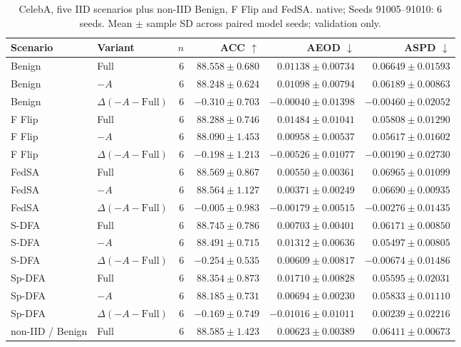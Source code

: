 \begin{table}[t]
\centering
\small
\caption{CelebA, five IID scenarios plus non-IID Benign, F Flip and FedSA. native; Seeds 91005–91010: 6 seeds. Mean $\pm$ sample SD across paired model seeds; validation only.}
\begin{tabular}{llrrrr}
\toprule
Scenario & Variant & $n$ & ACC $\uparrow$ & AEOD $\downarrow$ & ASPD $\downarrow$ \\
\midrule
Benign & Full & 6 & $88.558 \pm 0.680$ & $0.01138 \pm 0.00734$ & $0.06649 \pm 0.01593$ \\
Benign & $-A$ & 6 & $88.248 \pm 0.624$ & $0.01098 \pm 0.00794$ & $0.06189 \pm 0.00863$ \\
Benign & $\Delta(-A-\mathrm{Full})$ & 6 & $-0.310 \pm 0.703$ & $-0.00040 \pm 0.01398$ & $-0.00460 \pm 0.02052$ \\
F Flip & Full & 6 & $88.288 \pm 0.746$ & $0.01484 \pm 0.01041$ & $0.05808 \pm 0.01290$ \\
F Flip & $-A$ & 6 & $88.090 \pm 1.453$ & $0.00958 \pm 0.00537$ & $0.05617 \pm 0.01602$ \\
F Flip & $\Delta(-A-\mathrm{Full})$ & 6 & $-0.198 \pm 1.213$ & $-0.00526 \pm 0.01077$ & $-0.00190 \pm 0.02730$ \\
FedSA & Full & 6 & $88.569 \pm 0.867$ & $0.00550 \pm 0.00361$ & $0.06965 \pm 0.01099$ \\
FedSA & $-A$ & 6 & $88.564 \pm 1.127$ & $0.00371 \pm 0.00249$ & $0.06690 \pm 0.00935$ \\
FedSA & $\Delta(-A-\mathrm{Full})$ & 6 & $-0.005 \pm 0.983$ & $-0.00179 \pm 0.00515$ & $-0.00276 \pm 0.01435$ \\
S-DFA & Full & 6 & $88.745 \pm 0.786$ & $0.00703 \pm 0.00401$ & $0.06171 \pm 0.00850$ \\
S-DFA & $-A$ & 6 & $88.491 \pm 0.715$ & $0.01312 \pm 0.00636$ & $0.05497 \pm 0.00805$ \\
S-DFA & $\Delta(-A-\mathrm{Full})$ & 6 & $-0.254 \pm 0.535$ & $0.00609 \pm 0.00817$ & $-0.00674 \pm 0.01486$ \\
Sp-DFA & Full & 6 & $88.354 \pm 0.873$ & $0.01710 \pm 0.00828$ & $0.05595 \pm 0.02031$ \\
Sp-DFA & $-A$ & 6 & $88.185 \pm 0.731$ & $0.00694 \pm 0.00230$ & $0.05833 \pm 0.01110$ \\
Sp-DFA & $\Delta(-A-\mathrm{Full})$ & 6 & $-0.169 \pm 0.749$ & $-0.01016 \pm 0.01011$ & $0.00239 \pm 0.02216$ \\
non-IID / Benign & Full & 6 & $88.585 \pm 1.423$ & $0.00623 \pm 0.00389$ & $0.06411 \pm 0.00673$ \\

\end{tabular}
\end{table}
